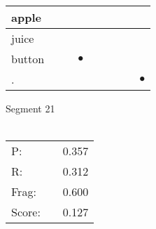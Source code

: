 \documentclass[landscape]{article}
\newcommand{\ssp}{\hspace{2pt}}
\newcommand{\mex}{\cellcolor{g}$\bullet$}
\begin{document}
\begin{tabular}{|l|p{10pt}|p{10pt}|p{10pt}|p{10pt}|p{10pt}|p{10pt}|p{10pt}|p{10pt}|}
\hline
\ssp apple \ssp&\hspace{2pt}&\hspace{2pt}&\hspace{2pt}&\hspace{2pt}&\hspace{2pt}&\hspace{2pt}&\hspace{2pt}&\hspace{2pt}\\
\hline
\ssp juice \ssp&\hspace{2pt}&\hspace{2pt}&\hspace{2pt}&\hspace{2pt}&\hspace{2pt}&\hspace{2pt}&\hspace{2pt}&\hspace{2pt}\\
\hline
\ssp \cellcolor{ref2}button \ssp&\hspace{2pt}&\hspace{2pt}&\hspace{2pt}\mex&\hspace{2pt}&\hspace{2pt}&\hspace{2pt}&\hspace{2pt}&\hspace{2pt}\\
\hline
\ssp \cellcolor{ref7}. \ssp&\hspace{2pt}&\hspace{2pt}&\hspace{2pt}&\hspace{2pt}&\hspace{2pt}&\hspace{2pt}&\hspace{2pt}&\hspace{2pt}\mex\\
\hline
\end{tabular}

\vspace{6pt}
\noindent Segment 21\\\\
\noindent\begin{tabular}{lm{12pt}r}
\hline
P:&&0.357\\
R:&&0.312\\
Frag:&&0.600\\
Score:&&0.127\\
\end{tabular}
\end{document}
